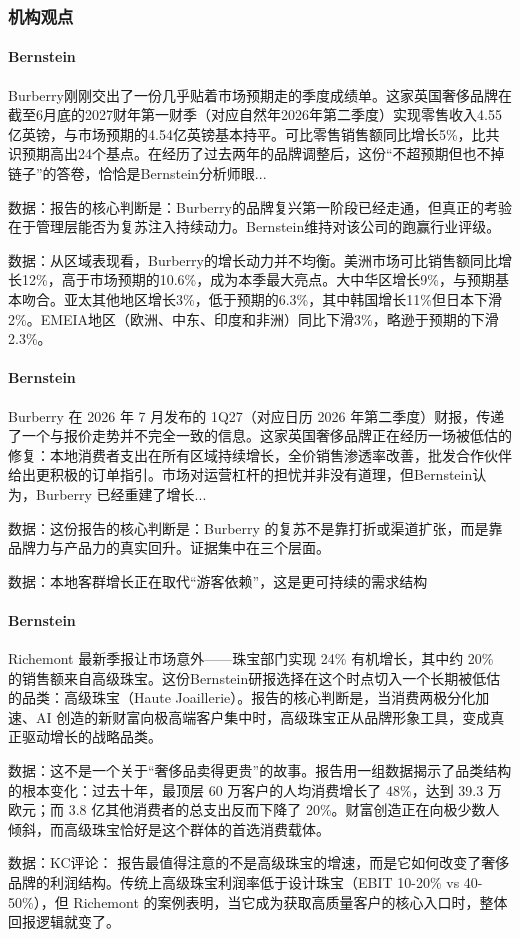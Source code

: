\documentclass[11pt]{ctexart}
\begin{document}
\subsubsection*{机构观点}
\paragraph{Bernstein} Burberry刚刚交出了一份几乎贴着市场预期走的季度成绩单。这家英国奢侈品牌在截至6月底的2027财年第一财季（对应自然年2026年第二季度）实现零售收入4.55亿英镑，与市场预期的4.54亿英镑基本持平。可比零售销售额同比增长5\%，比共识预期高出24个基点。在经历了过去两年的品牌调整后，这份“不超预期但也不掉链子”的答卷，恰恰是Bernstein分析师眼...
{\small\color{refgray}数据：报告的核心判断是：Burberry的品牌复兴第一阶段已经走通，但真正的考验在于管理层能否为复苏注入持续动力。Bernstein维持对该公司的跑赢行业评级。\par}
{\small\color{refgray}数据：从区域表现看，Burberry的增长动力并不均衡。美洲市场可比销售额同比增长12\%，高于市场预期的10.6\%，成为本季最大亮点。大中华区增长9\%，与预期基本吻合。亚太其他地区增长3\%，低于预期的6.3\%，其中韩国增长11\%但日本下滑2\%。EMEIA地区（欧洲、中东、印度和非洲）同比下滑3\%，略逊于预期的下滑2.3\%。\par}
\paragraph{Bernstein} Burberry 在 2026 年 7 月发布的 1Q27（对应日历 2026 年第二季度）财报，传递了一个与报价走势并不完全一致的信息。这家英国奢侈品牌正在经历一场被低估的修复：本地消费者支出在所有区域持续增长，全价销售渗透率改善，批发合作伙伴给出更积极的订单指引。市场对运营杠杆的担忧并非没有道理，但Bernstein认为，Burberry 已经重建了增长...
{\small\color{refgray}数据：这份报告的核心判断是：Burberry 的复苏不是靠打折或渠道扩张，而是靠品牌力与产品力的真实回升。证据集中在三个层面。\par}
{\small\color{refgray}数据：本地客群增长正在取代“游客依赖”，这是更可持续的需求结构\par}
\paragraph{Bernstein} Richemont 最新季报让市场意外——珠宝部门实现 24\% 有机增长，其中约 20\% 的销售额来自高级珠宝。这份Bernstein研报选择在这个时点切入一个长期被低估的品类：高级珠宝（Haute Joaillerie）。报告的核心判断是，当消费两极分化加速、AI 创造的新财富向极高端客户集中时，高级珠宝正从品牌形象工具，变成真正驱动增长的战略品类。
{\small\color{refgray}数据：这不是一个关于“奢侈品卖得更贵”的故事。报告用一组数据揭示了品类结构的根本变化：过去十年，最顶层 60 万客户的人均消费增长了 48\%，达到 39.3 万欧元；而 3.8 亿其他消费者的总支出反而下降了 20\%。财富创造正在向极少数人倾斜，而高级珠宝恰好是这个群体的首选消费载体。\par}
{\small\color{refgray}数据：KC评论： 报告最值得注意的不是高级珠宝的增速，而是它如何改变了奢侈品牌的利润结构。传统上高级珠宝利润率低于设计珠宝（EBIT 10-20\% vs 40-50\%），但 Richemont 的案例表明，当它成为获取高质量客户的核心入口时，整体回报逻辑就变了。\par}
\end{document}
